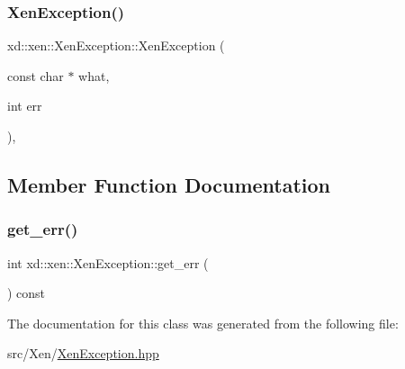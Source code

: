 \subsubsection{\texorpdfstring{Xen\+Exception()}{XenException()}\hspace{0.1cm}{\footnotesize\ttfamily [4/4]}}
{\footnotesize\ttfamily xd\+::xen\+::\+Xen\+Exception\+::\+Xen\+Exception (\begin{DoxyParamCaption}\item[{const char $\ast$}]{what,  }\item[{int}]{err }\end{DoxyParamCaption})\hspace{0.3cm}{\ttfamily [inline]}, {\ttfamily [explicit]}}



\subsection{Member Function Documentation}
\mbox{\label{classxd_1_1xen_1_1_xen_exception_a4595157c80ab52416f511f78c5ebb5c2}} 
\subsubsection{\texorpdfstring{get\+\_\+err()}{get\_err()}}
{\footnotesize\ttfamily int xd\+::xen\+::\+Xen\+Exception\+::get\+\_\+err (\begin{DoxyParamCaption}{ }\end{DoxyParamCaption}) const\hspace{0.3cm}{\ttfamily [inline]}}



The documentation for this class was generated from the following file\+:\begin{DoxyCompactItemize}
\item 
src/\+Xen/\mbox{\hyperlink{_xen_exception_8hpp}{Xen\+Exception.\+hpp}}\end{DoxyCompactItemize}
